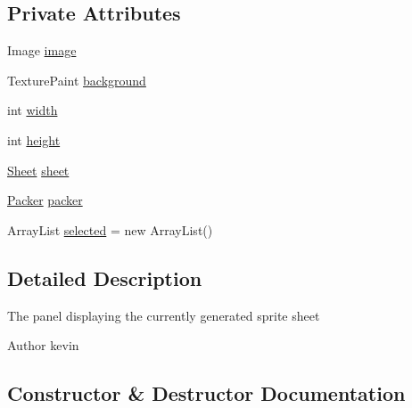 \subsection*{Private Attributes}
\begin{DoxyCompactItemize}
\item 
Image \mbox{\hyperlink{classorg_1_1newdawn_1_1slick_1_1tools_1_1packulike_1_1_sheet_panel_a5f4ba74e6f8b8077e7f0797d45d57c8c}{image}}
\item 
Texture\+Paint \mbox{\hyperlink{classorg_1_1newdawn_1_1slick_1_1tools_1_1packulike_1_1_sheet_panel_a2cc6715b37c2d4a0870a9cbebe684729}{background}}
\item 
int \mbox{\hyperlink{classorg_1_1newdawn_1_1slick_1_1tools_1_1packulike_1_1_sheet_panel_a9a26b63a540293ca2f8d9f5a8290fdf6}{width}}
\item 
int \mbox{\hyperlink{classorg_1_1newdawn_1_1slick_1_1tools_1_1packulike_1_1_sheet_panel_afa5b07570c513dfef8a1be4735c8da3a}{height}}
\item 
\mbox{\hyperlink{classorg_1_1newdawn_1_1slick_1_1tools_1_1packulike_1_1_sheet}{Sheet}} \mbox{\hyperlink{classorg_1_1newdawn_1_1slick_1_1tools_1_1packulike_1_1_sheet_panel_a0b2d5c2c29f98d3da15ad5be1e666286}{sheet}}
\item 
\mbox{\hyperlink{classorg_1_1newdawn_1_1slick_1_1tools_1_1packulike_1_1_packer}{Packer}} \mbox{\hyperlink{classorg_1_1newdawn_1_1slick_1_1tools_1_1packulike_1_1_sheet_panel_abb5acf8625323539da1fea16df35d97e}{packer}}
\item 
Array\+List \mbox{\hyperlink{classorg_1_1newdawn_1_1slick_1_1tools_1_1packulike_1_1_sheet_panel_a307218d49f6dfea97933ccf80ab293aa}{selected}} = new Array\+List()
\end{DoxyCompactItemize}


\subsection{Detailed Description}
The panel displaying the currently generated sprite sheet

\begin{DoxyAuthor}{Author}
kevin 
\end{DoxyAuthor}


\subsection{Constructor \& Destructor Documentation}
\mbox{\label{classorg_1_1newdawn_1_1slick_1_1tools_1_1packulike_1_1_sheet_panel_ae01d1800c5c8933f3dcd7ed331fe80cf}} 
